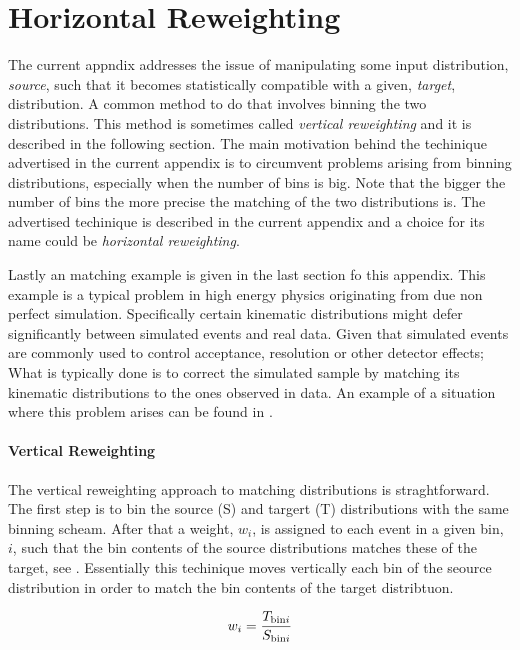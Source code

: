 
\chapter{Horizontal Reweighting}
\label{AppendixB}

The current appndix addresses the issue of manipulating some input distribution, {\it source}, such that
it becomes statistically compatible with a given, {\it target}, distribution. A common method to do that
involves binning the two distributions. This method is sometimes called {\it vertical reweighting}
and it is described in the following section. The main motivation behind the techinique advertised in the current
appendix is to circumvent problems arising from binning distributions, especially when the number of
bins is big. Note that the bigger the number of bins the more precise the matching of the two distributions
is. The advertised techinique is described in the current appendix and a choice for its name could be {\it horizontal reweighting}.

Lastly an matching example is given in the last section fo this appendix. This example is a typical problem
in high energy physics originating from due non perfect simulation. Specifically certain kinematic
distributions might defer significantly between simulated events and real data. Given that simulated
events are commonly used to control acceptance, resolution or other detector effects; What is typically
done is to correct the simulated sample by matching its kinematic distributions to the ones observed in data.
An example of a situation where this problem arises can be found in .

\subsubsection{Vertical Reweighting}
The vertical reweighting approach to matching distributions is straghtforward.
The first step is to bin the source (S) and targert (T) distributions with the same binning scheam.
After that a weight, $w_i$, is assigned to each event in a given bin, $i$, such that the bin
contents of the source distributions matches these of the target, see .
Essentially this techinique moves vertically each bin of the seource distribution in order to match
the bin contents of the target distribtuon.

\begin{equation}
  \centering
  w_i = \frac{T_{{\rm bin}i}}{S_{{\rm bin}i}}
\label{vert_rew}
\end{equation}

